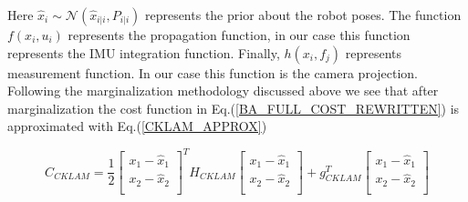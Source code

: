 Here $\hat{x}_i \sim \mathcal{N}(\hat x_{i|i}, P_{i|i})$ represents the prior about the robot poses. The function $f(x_i, u_i)$ represents the propagation function, in our case this function represents the IMU integration function. Finally, $h(x_i,f_j)$ represents measurement function. In our case this function is the camera projection. Following the marginalization methodology discussed above we see that after marginalization the cost function in Eq.(\ref{BA_FULL_COST_REWRITTEN}) is approximated with Eq.(\ref{CKLAM_APPROX})

\begin{equation}
	C_{CKLAM} = \frac{1}{2}
							\begin{bmatrix} 
								x_{1} - \hat x_{1} \\
								x_{2} - \hat x_{2} \\
							\end{bmatrix}^T H_{CKLAM} 
							\begin{bmatrix} 
								x_{1} - \hat x_{1} \\
								x_{2} - \hat x_{2} \\
							\end{bmatrix} + g_{CKLAM}^T
							\begin{bmatrix} 
								x_{1} - \hat x_{1} \\
								x_{2} - \hat x_{2} \\
							\end{bmatrix}
	\label{CKLAM_APPROX}
\end{equation}


